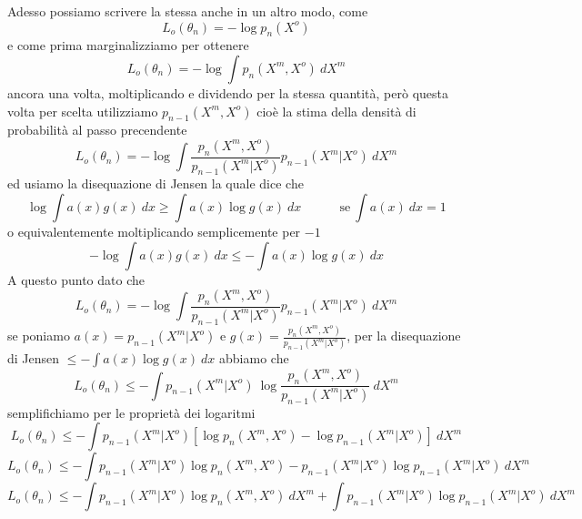 \noindent Adesso possiamo scrivere la stessa anche in un altro modo, come 
\begin{equation}
L_o (\theta_n) = - \log p_n(X^o)
\end{equation}
e come prima marginalizziamo per ottenere
\begin{equation}
L_o (\theta_n) = - \log \int p_n(X^m, X^o) \ dX^m
\end{equation}
ancora una volta, moltiplicando e dividendo per la stessa quantità, però questa volta per scelta utilizziamo $p_{n-1}(X^m, X^o)$ cioè la stima della densità di probabilità al passo precendente 
\begin{equation}
L_o (\theta_n) = - \log \int \frac{p_n(X^m, X^o)}{p_{n-1}(X^m | X^o)} p_{n-1}(X^m | X^o) \ dX^m
\end{equation}
ed usiamo la disequazione di Jensen la quale dice che
\begin{equation}
\log \int a(x) g(x) \ dx \geq \int a(x) \log g(x) \ dx \quad \quad \quad \text{se} \ \int a(x) \ dx = 1
\end{equation}
o equivalentemente moltiplicando semplicemente per $-1$
\begin{equation}
- \log \int a(x) g(x) \ dx \leq - \int a(x) \log g(x) \ dx
\end{equation}
A questo punto dato che 
\begin{equation}
L_o (\theta_n) = - \log \int \frac{p_n(X^m, X^o)}{p_{n-1}(X^m | X^o)} p_{n-1}(X^m | X^o) \ dX^m
\end{equation}
se poniamo $a(x) = p_{n-1}(X^m | X^o)$ e $g(x) = \frac{p_n(X^m, X^o)}{p_{n-1}(X^m | X^o)}$,
per la disequazione di Jensen $ \leq - \int a(x) \log g(x) \ dx$ abbiamo che
\begin{equation}
L_o (\theta_n) \leq - \int p_{n-1}(X^m | X^o) \ \log \frac{p_n(X^m, X^o)}{p_{n-1}(X^m | X^o)} \ dX^m
\end{equation}
semplifichiamo per le proprietà dei logaritmi
\begin{equation}
L_o (\theta_n) \leq - \int p_{n-1}(X^m | X^o) \left[ \log p_n(X^m, X^o) - \log p_{n-1}(X^m | X^o) \right] \ dX^m
\end{equation}
\begin{equation}
L_o (\theta_n) \leq - \int p_{n-1}(X^m | X^o) \log p_n(X^m, X^o) -  p_{n-1}(X^m | X^o) \log p_{n-1}(X^m | X^o) \ dX^m
\end{equation}
\begin{equation}
L_o (\theta_n) \leq - \int p_{n-1}(X^m | X^o) \log p_n(X^m, X^o) \ dX^m + \int p_{n-1}(X^m | X^o) \log p_{n-1}(X^m | X^o) \ dX^m
\end{equation}
